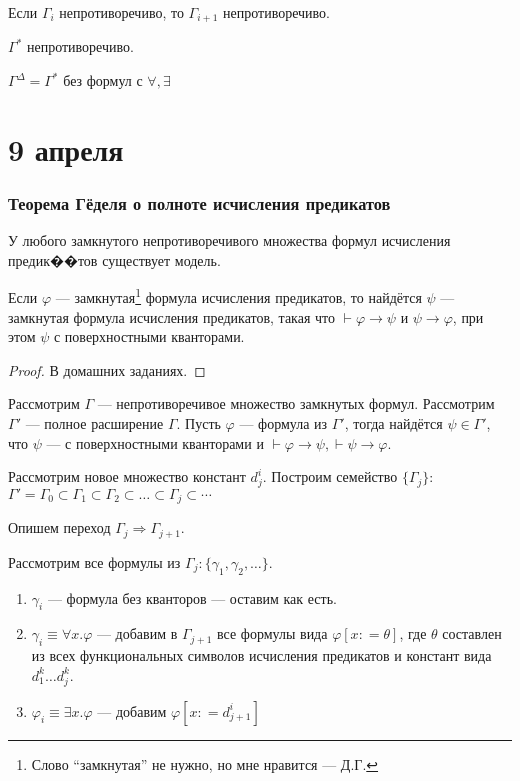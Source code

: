 \begin{theorem}
    Если \(\Gamma_i\) непротиворечиво, то \(\Gamma_{i + 1}\) непротиворечиво.
\end{theorem}
\begin{theorem}
    \(\Gamma^*\) непротиворечиво.
\end{theorem}
\(\Gamma^\Delta = \Gamma^*\) без формул с \(\forall , \exists \)

\chapter{9 апреля}

\subsection{Теорема Гёделя о полноте исчисления предикатов}

\begin{theorem}
    У любого замкнутого непротиворечивого множества формул исчисления предик��тов существует модель.
\end{theorem}

\begin{theorem}
    Если \(\varphi\) --- замкнутая\footnote{Слово ``замкнутая'' не нужно, но мне нравится --- Д.Г.} формула исчисления предикатов, то найдётся \(\psi\) --- замкнутая формула исчисления предикатов, такая что \(\vdash \varphi \to \psi\) и \(\psi \to \varphi\), при этом \(\psi\) с поверхностными кванторами.
\end{theorem}
\begin{proof}
    В домашних заданиях.
\end{proof}

Рассмотрим \(\Gamma\) --- непротиворечивое множество замкнутых формул. Рассмотрим \(\Gamma'\) --- полное расширение \(\Gamma\). Пусть \(\varphi\) --- формула из \(\Gamma'\), тогда найдётся \(\psi \in \Gamma'\), что \(\psi\) --- с поверхностными кванторами и \(\vdash \varphi \to \psi, \vdash \psi \to \varphi\).

Рассмотрим новое множество констант \(d_j^i\). Построим семейство \(\{\Gamma_j\}\): \(\Gamma' = \Gamma_0 \subset \Gamma_1 \subset \Gamma_2 \subset \dots \subset \Gamma_j \subset \cdots\)

Опишем переход \(\Gamma_j \Rightarrow \Gamma_{j + 1}\).

Рассмотрим все формулы из \(\Gamma_j : \{\gamma_1, \gamma_2, \dots\}\).
\begin{enumerate}
    \item \(\gamma_i\) --- формула без кванторов --- оставим как есть.
    \item \(\gamma_i \equiv \forall x.\varphi\) --- добавим в \(\Gamma_{j + 1}\) все формулы вида \(\varphi[x: = \theta]\), где \(\theta\) составлен из всех функциональных символов исчисления предикатов и констант вида \(d_1^k \dots d_j^k\).
    \item \(\varphi_i \equiv \exists x.\varphi\) --- добавим \(\varphi[x: = d^i_{j + 1}]\)
\end{enumerate}

